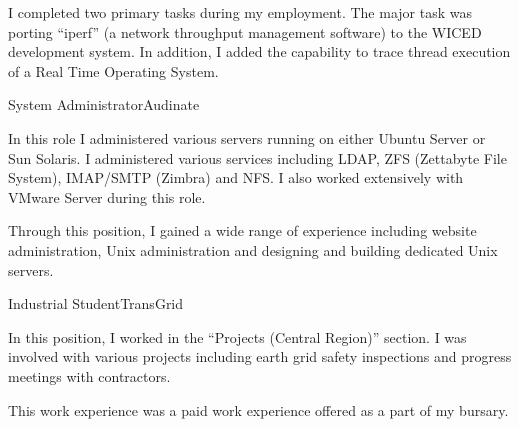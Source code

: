 \documentclass[10pt]{article}
\begin{document}
\begin{professionalExperience}
{I completed two primary tasks during my employment. The major task was porting 
``iperf'' (a network throughput management software) to the WICED development 
system. In addition, I added the capability to trace thread execution of a Real 
Time Operating System.}
{
    
    
    
}

{System Administrator}{Audinate}
{In this role I administered various servers running on either Ubuntu Server or 
Sun Solaris. I administered various services including LDAP, ZFS (Zettabyte File
System), IMAP/SMTP (Zimbra) and NFS. I also worked extensively with VMware 
Server during this role.

Through this position, I gained a wide range of experience including website
administration, Unix administration and designing and building dedicated Unix
servers.}
{
    
    
    
    
    
    
}

{Industrial Student}{TransGrid}
{In this position, I worked in the ``Projects (Central Region)'' section. I was 
involved with various projects including earth grid safety inspections and 
progress meetings with contractors.

This work experience was a paid work experience offered as a part of my 
 bursary.

}
\end{professionalExperience}
\end{document}
